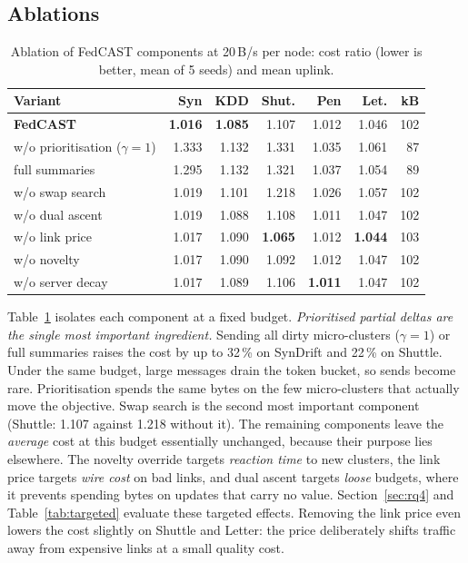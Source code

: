 \subsection{Ablations}\label{sec:ablation}

\begin{table}[t]
\centering\small
\caption{Ablation of FedCAST components at 20\,B/s per node: cost ratio (lower is better, mean of 5 seeds) and mean uplink.}\label{tab:ablation}
\setlength{\tabcolsep}{2.6pt}
\begin{tabular}{@{}lrrrrrr@{}}
\toprule
Variant & Syn & KDD & Shut. & Pen & Let. & kB\\
\midrule
\textbf{FedCAST} & \textbf{1.016} & \textbf{1.085} & 1.107 & 1.012 & 1.046 & 102\\
w/o prioritisation ($\gamma{=}1$) & 1.333 & 1.132 & 1.331 & 1.035 & 1.061 & 87\\
full summaries & 1.295 & 1.132 & 1.321 & 1.037 & 1.054 & 89\\
w/o swap search & 1.019 & 1.101 & 1.218 & 1.026 & 1.057 & 102\\
w/o dual ascent & 1.019 & 1.088 & 1.108 & 1.011 & 1.047 & 102\\
w/o link price & 1.017 & 1.090 & \textbf{1.065} & 1.012 & \textbf{1.044} & 103\\
w/o novelty & 1.017 & 1.090 & 1.092 & 1.012 & 1.047 & 102\\
w/o server decay & 1.017 & 1.089 & 1.106 & \textbf{1.011} & 1.047 & 102\\
\bottomrule
\end{tabular}
\end{table}

Table~\ref{tab:ablation} isolates each component at a fixed budget. \emph{Prioritised partial deltas are the single most important ingredient.} Sending all dirty micro-clusters ($\gamma{=}1$) or full summaries raises the cost by up to 32\,\% on SynDrift and 22\,\% on Shuttle. Under the same budget, large messages drain the token bucket, so sends become rare. Prioritisation spends the same bytes on the few micro-clusters that actually move the objective. Swap search is the second most important component (Shuttle: 1.107 against 1.218 without it). The remaining components leave the \emph{average} cost at this budget essentially unchanged, because their purpose lies elsewhere. The novelty override targets \emph{reaction time} to new clusters, the link price targets \emph{wire cost} on bad links, and dual ascent targets \emph{loose} budgets, where it prevents spending bytes on updates that carry no value. Section~\ref{sec:rq4} and Table~\ref{tab:targeted} evaluate these targeted effects. Removing the link price even lowers the cost slightly on Shuttle and Letter: the price deliberately shifts traffic away from expensive links at a small quality cost.
